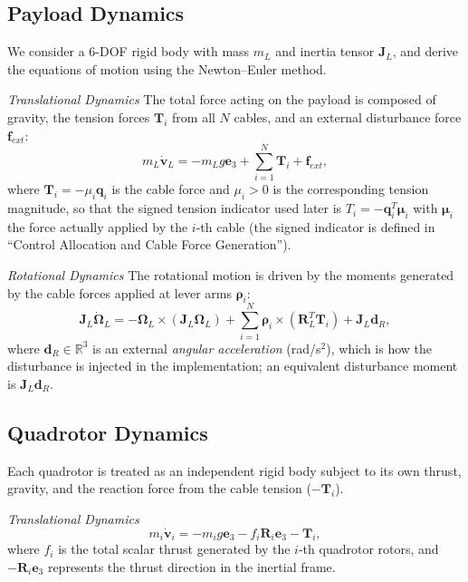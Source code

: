 \documentclass[Review,sageh,times]{sagej}
\begin{document}
\subsection*{Payload Dynamics}

We consider a 6-DOF rigid body with mass $m_L$ and inertia tensor $\mathbf{J}_L$, and
derive the equations of motion using the Newton--Euler method.

\emph{Translational Dynamics} The total force acting on the payload is
composed of gravity, the tension forces $\mathbf{T}_i$ from all $N$ cables, and an
external disturbance force $\mathbf{f}_{ext}$:
\begin{equation}
m_L\dot{\mathbf{v}}_L = -m_L g\mathbf{e}_3 + \sum_{i=1}^{N}\mathbf{T}_i + \mathbf{f}_{ext},
\label{eq:paytransl}
\end{equation}
where $\mathbf{T}_i=-\mu_i\mathbf{q}_i$ is the cable force and $\mu_i>0$ is the
corresponding tension magnitude, so that the signed tension indicator used
later is $T_i=-\mathbf{q}_i^{T}\boldsymbol{\mu}_i$ with $\boldsymbol{\mu}_i$ the force
actually applied by the $i$-th cable (the signed indicator is defined in ``Control Allocation and Cable Force Generation'').

\emph{Rotational Dynamics} The rotational motion is driven by the moments
generated by the cable forces applied at lever arms $\boldsymbol{\rho}_i$:
\begin{equation}
\mathbf{J}_L\dot{\boldsymbol{\Omega}}_L = -\boldsymbol{\Omega}_L\times(\mathbf{J}_L\boldsymbol{\Omega}_L)
+ \sum_{i=1}^{N}\boldsymbol{\rho}_i\times(\mathbf{R}_L^{T}\mathbf{T}_i) + \mathbf{J}_L\mathbf{d}_R,
\label{eq:payrot}
\end{equation}
where $\mathbf{d}_R\in\mathbb{R}^3$ is an external \emph{angular acceleration}
(rad/s$^2$), which is how the disturbance is injected in the implementation;
an equivalent disturbance moment is $\mathbf{J}_L\mathbf{d}_R$.

\subsection*{Quadrotor Dynamics}

Each quadrotor is treated as an independent rigid body subject to its own
thrust, gravity, and the reaction force from the cable tension ($-\mathbf{T}_i$).

\emph{Translational Dynamics}
\begin{equation}
m_i\dot{\mathbf{v}}_i = -m_i g\mathbf{e}_3 - f_i\mathbf{R}_i\mathbf{e}_3 - \mathbf{T}_i,
\label{eq:quadtransl}
\end{equation}
where $f_i$ is the total scalar thrust generated by the $i$-th quadrotor rotors,
and $-\mathbf{R}_i\mathbf{e}_3$ represents the thrust direction in the inertial frame.
\end{document}
